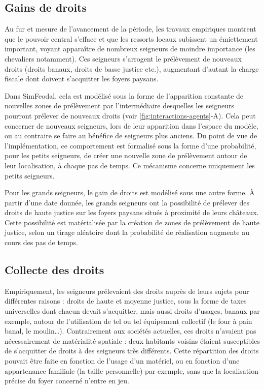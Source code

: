\subsection{Gains de droits}

Au fur et mesure de l'avancement de la période, les travaux empiriques montrent que le pouvoir central s'efface et que les ressorts locaux subissent un émiettement important, voyant apparaître de nombreux seigneurs de moindre importance (les chevaliers notamment).
Ces seigneurs s'arrogent le prélèvement de nouveaux droits (droits banaux, droits de basse justice etc.), augmentant d'autant la charge fiscale dont doivent s'acquitter les foyers paysans.


\begin{tcolorbox}[breakable,left=0pt,right=0pt,top=0pt,bottom=0pt,
	colback=gray!15,colframe=gray!15,width=\dimexpr\textwidth\relax, 
	enlarge left by=0mm, boxsep=5pt,arc=0pt,outer arc=0pt]
Dans SimFeodal, cela est modélisé sous la forme de l'apparition constante de nouvelles zones de prélèvement par l'intermédiaire desquelles les seigneurs pourront prélever de nouveaux droits (voir \cref{fig:interactions-agents}-A).
Cela peut concerner de nouveaux seigneurs, lors de leur apparition dans l'espace du modèle, ou au contraire se faire au bénéfice de seigneurs plus anciens.
Du point de vue de l'implémentation, ce comportement est formalisé sous la forme d'une probabilité, pour les petits seigneurs, de créer une nouvelle zone de prélèvement autour de leur localisation, à chaque pas de temps.
Ce mécanisme concerne uniquement les petits seigneurs.

\medskip
Pour les grands seigneurs, le gain de droits est modélisé sous une autre forme.
À partir d'une date donnée, les grands seigneurs ont la possibilité de prélever des droits de haute justice sur les foyers paysans situés à proximité de leurs châteaux.
Cette possibilité est matérialisée par la création de zones de prélèvement de haute justice, selon un tirage aléatoire dont la probabilité de réalisation augmente au cours des pas de temps.
\end{tcolorbox}

\subsection{Collecte des droits}

Empiriquement, les seigneurs prélevaient des droits auprès de leurs sujets pour différentes raisons : droits de haute et moyenne justice, sous la forme de taxes universelles dont chacun devait s'acquitter, mais aussi droits d'usages, banaux par exemple, autour de l'utilisation de tel ou tel équipement collectif (le four à pain banal, le moulin\ldots).
Contrairement aux sociétés actuelles, ces droits n'avaient pas nécessairement de matérialité spatiale : deux habitants voisins étaient susceptibles de s'acquitter de droits à des seigneurs très différents.
Cette répartition des droits pouvait être faite en fonction de l'usage d'un matériel, ou en fonction d'une appartenance familiale (la \og taille\fg{} personnelle) par exemple, sans que la localisation précise du foyer concerné n'entre en jeu.

